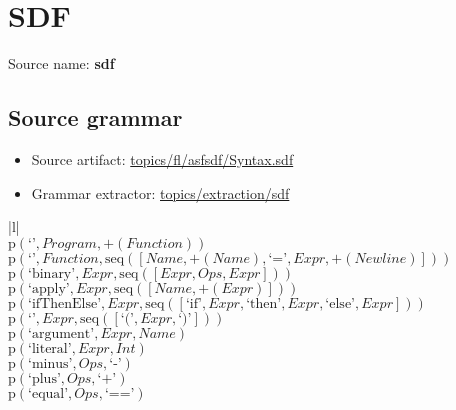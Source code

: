 \chapter{SDF}

 Source name: \textbf{sdf}

\section{Source grammar}

\begin{itemize}
\item Source artifact: \href{http://github.com/grammarware/slps/blob/master/topics/fl/asfsdf/Syntax.sdf}{topics/fl/asfsdf/Syntax.sdf}
\item Grammar extractor: \href{http://github.com/grammarware/slps/blob/master/topics/extraction/sdf}{topics/extraction/sdf}
\end{itemize}

\footnotesize\begin{center}\begin{tabular}{|l|}\hline
{}
\\\hline
$\mathrm{p}(\text{`'},\mathit{Program},\plus \left(\mathit{Function}\right))$	\\
$\mathrm{p}(\text{`'},\mathit{Function},\mathrm{seq}\left(\left[\mathit{Name}, \plus \left(\mathit{Name}\right), \text{`='}, \mathit{Expr}, \plus \left(\mathit{Newline}\right)\right]\right))$	\\
$\mathrm{p}(\text{`binary'},\mathit{Expr},\mathrm{seq}\left(\left[\mathit{Expr}, \mathit{Ops}, \mathit{Expr}\right]\right))$	\\
$\mathrm{p}(\text{`apply'},\mathit{Expr},\mathrm{seq}\left(\left[\mathit{Name}, \plus \left(\mathit{Expr}\right)\right]\right))$	\\
$\mathrm{p}(\text{`ifThenElse'},\mathit{Expr},\mathrm{seq}\left(\left[\text{`if'}, \mathit{Expr}, \text{`then'}, \mathit{Expr}, \text{`else'}, \mathit{Expr}\right]\right))$	\\
$\mathrm{p}(\text{`'},\mathit{Expr},\mathrm{seq}\left(\left[\text{`('}, \mathit{Expr}, \text{`)'}\right]\right))$	\\
$\mathrm{p}(\text{`argument'},\mathit{Expr},\mathit{Name})$	\\
$\mathrm{p}(\text{`literal'},\mathit{Expr},\mathit{Int})$	\\
$\mathrm{p}(\text{`minus'},\mathit{Ops},\text{`-'})$	\\
$\mathrm{p}(\text{`plus'},\mathit{Ops},\text{`+'})$	\\
$\mathrm{p}(\text{`equal'},\mathit{Ops},\text{`=='})$	\\
\hline\end{tabular}\end{center}



